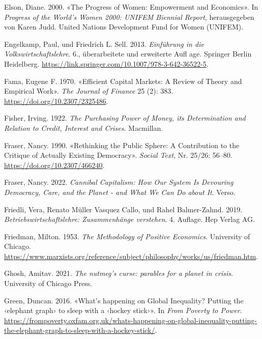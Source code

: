 \documentclass[
  nswissgerman,
  a4paper,
  DIV=11,
  numbers=noendperiod,
  oneside,
  openany]{scrreprt}
\newlength{\cslhangindent}
\newenvironment{CSLReferences}[2] %
 {\begin{list}{}{%
  \setlength{\itemindent}{0pt}
  \setlength{\leftmargin}{0pt}
  \setlength{\parsep}{0pt}
  \ifodd #1
   \setlength{\leftmargin}{\cslhangindent}
   \setlength{\itemindent}{-1\cslhangindent}
  \fi
  \setlength{\itemsep}{#2\baselineskip}}}
 {\end{list}}
\begin{document}
\begin{CSLReferences}{1}{1}
Elson, Diane. 2000. {«The {Progress} of {Women}: {Empowerment} and
{Economics}»}. In \emph{Progress of the {World}'s {Women} 2000: {UNIFEM}
{Biennial} {Report}}, herausgegeben von Karen Judd. United Nations
Development Fund for Women (UNIFEM).

Engelkamp, Paul, und Friedrich L. Sell. 2013. \emph{Einführung in die
Volkswirtschaftslehre}. 6., überarbeitete und erweiterte Aufl age.
Springer Berlin Heidelberg.
\url{https://link.springer.com/10.1007/978-3-642-36522-5}.

Fama, Eugene F. 1970. {«Efficient {Capital} {Markets}: {A} {Review} of
{Theory} and {Empirical} {Work}»}. \emph{The Journal of Finance} 25 (2):
383. \url{https://doi.org/10.2307/2325486}.

Fisher, Irving. 1922. \emph{The Purchasing Power of Money, its
Determination and Relation to Credit, Interest and Crises}. Macmillan.

Fraser, Nancy. 1990. {«Rethinking the {Public} {Sphere}: {A}
{Contribution} to the {Critique} of {Actually} {Existing} {Democracy}»}.
\emph{Social Text}, Nr. 25/26: 56--80.
\url{https://doi.org/10.2307/466240}.

Fraser, Nancy. 2022. \emph{Cannibal {Capitalism}: {How} {Our} {System}
{Is} {Devouring} {Democracy}, {Care}, and the {Planet} - and {What} {We}
{Can} {Do} about {It}}. Verso.

Friedli, Vera, Renato Müller Vasquez Callo, und Rahel Balmer-Zahnd.
2019. \emph{Betriebswirtschaftslehre: Zusammenhänge verstehen}. 4.
Auflage. Hep Verlag AG.

Friedman, Milton. 1953. \emph{The Methodology of Positive Economics}.
University of Chicago.
\url{https://www.marxists.org/reference/subject/philosophy/works/us/friedman.htm}.

Ghosh, Amitav. 2021. \emph{The nutmeg's curse: parables for a planet in
crisis}. University of Chicago Press.

Green, Duncan. 2016. {«What's happening on {Global} {Inequality}?
{Putting} the {‹elephant graph›} to sleep with a {‹hockey stick›}»}. In
\emph{From Poverty to Power}.
\url{https://frompoverty.oxfam.org.uk/whats-happening-on-global-inequality-putting-the-elephant-graph-to-sleep-with-a-hockey-stick/}.


\end{CSLReferences}
\end{document}
